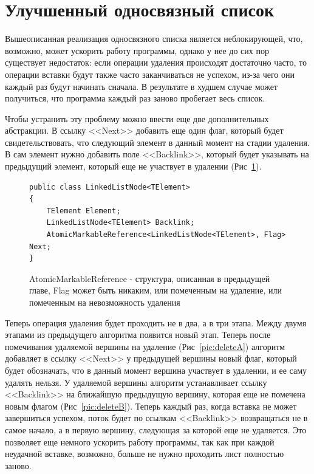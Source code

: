 \documentclass[12pt]{report}
\begin{document}
{		\section{Улучшенный односвязный список}
		\par Вышеописанная реализация односвязного списка является неблокирующей, что, возможно, может ускорить работу программы, однако у нее до сих пор существует недостаток: если операции удаления происходят достаточно часто, то операции вставки будут также часто заканчиваться не успехом, из-за чего они каждый раз будут начинать сначала. В результате в худшем случае может получиться, что программа каждый раз заново пробегает весь список.
		\par Чтобы устранить эту проблему можно ввести еще две дополнительных абстракции. В ссылку <<Next>> добавить еще один флаг, который будет свидетельствовать, что следующий элемент в данный момент на стадии удаления. В сам элемент нужно добавить поле <<Backlink>>, который будет указывать на предыдущий элемент, который еще не участвует в удалении (Рис~\ref{pic:backlink}). 
		\begin{figure}[h]
			\begin{lstlisting}
public class LinkedListNode<TElement>
{
	TElement Element;
	LinkedListNode<TElement> Backlink;
	AtomicMarkableReference<LinkedListNode<TElement>, Flag> Next;
}
			\end{lstlisting}
			\caption{AtomicMarkableReference - структура, описанная в предыдущей главе, Flag может быть никаким, или помеченным на удаление, или помеченным на невозможность удаления}
			\label{pic:backlink}
		\end{figure}
		Теперь операция удаления будет проходить не в два, а в три этапа. Между двумя этапами из предыдущего алгоритма появится новый этап. Теперь после помечивания удаляемой вершины на удаление (Рис~\ref{pic:deleteA}) алгоритм добавляет в ссылку <<Next>> у предыдущей вершины новый флаг, который будет обозначать, что в данный момент вершина участвует в удалении, и ее саму удалять нельзя. У удаляемой вершины алгоритм устанавливает ссылку <<Backlink>> на ближайшую предыдущую вершину, которая еще не помечена новым флагом (Рис~\ref{pic:deleteB}). Теперь каждый раз, когда вставка не может завершиться успехом, поток будет по ссылкам <<Backlink>> возвращаться не в самое начало, а в первую вершину, следующая за которой еще не удаляется. Это позволяет еще немного ускорить работу программы, так как при каждой неудачной вставке, возможно, больше не нужно проходить лист полностью заново.
		\begin{figure}[h!]

\end{figure}}
\end{document}
